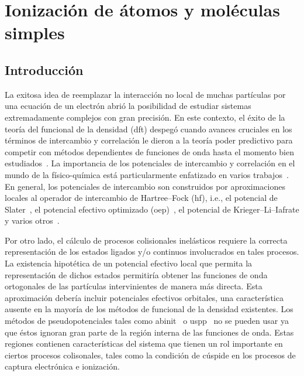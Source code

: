 \chapter{Ionización de átomos y moléculas simples}

\section{Introducción}

La exitosa idea de reemplazar la interacción no local de muchas 
partículas por una ecuación de un electrón abrió la posibilidad de 
estudiar sistemas extremadamente complejos con gran precisión.
En este contexto, el éxito de la teoría del funcional de la densidad
\cite{HohenberKohn:64,KohnSham:65} (\acs{dft}) despegó cuando avances 
cruciales en los términos de intercambio y correlación le dieron a la 
teoría poder predictivo para competir con métodos dependientes de 
funciones de onda hasta el momento bien estudiados~\cite{Becke:14}.
La importancia de los potenciales de intercambio y 
correlación en el mundo de la físico-química está particularmente
enfatizado en varios trabajos~\cite{Bartlett:10,Verma:12}.
En general, los potenciales de intercambio son construidos por 
aproximaciones locales al operador de intercambio de Hartree--Fock 
(\ac{hf}), i.e., el potencial de Slater~\cite{Slater:51}, el potencial 
efectivo optimizado (\ac{oep})~\cite{Sharp:53,Talman:76,Talman:89}, el 
potencial de Krieger--Li--Iafrate\cite{Krieger:92} y varios 
otros~\cite{Gorling:92,Yang:02,Staroverov:06,Ryabinkin:13}.

Por otro lado, el cálculo de procesos colisionales inelásticos requiere 
la correcta representación de los estados ligados y/o continuos 
involucrados en tales procesos. La existencia hipotética de un potencial 
efectivo local que permita la representación de dichos estados 
permitiría obtener las funciones de onda ortogonales de las partículas
intervinientes de manera más directa. Esta aproximación debería incluir
potenciales efectivos orbitales, una característica ausente en la 
mayoría de los métodos de funcional de la densidad existentes. 
Los métodos de pseudopotenciales tales como {\sc abinit}~\cite{abinit} 
o {\sc uspp}~\cite{Vanderbilt} no se pueden usar ya que éstos ignoran 
gran parte de la región interna de las funciones de onda. Estas regiones
contienen características del sistema que tienen un rol importante en
ciertos procesos colisonales, tales como la condición de cúspide en los 
procesos de captura electrónica e ionización. 

